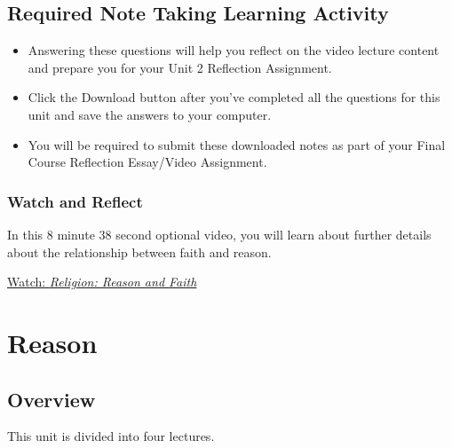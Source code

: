 \documentclass[
]{book}
\providecommand{\tightlist}{%
  \setlength{\itemsep}{0pt}\setlength{\parskip}{0pt}}
\begin{document}
\hypertarget{required-note-taking-learning-activity-1}{%
\section*{Required Note Taking Learning Activity}\label{required-note-taking-learning-activity-1}}

\begin{reflect}
\begin{itemize}
\tightlist
\item
  Answering these questions will help you reflect on the video lecture content and prepare you for your Unit 2 Reflection Assignment.
\item
  Click the Download button after you've completed all the questions for this unit and save the answers to your computer.
\item
  You will be required to submit these downloaded notes as part of your Final Course Reflection Essay/Video Assignment.
\end{itemize}
\end{reflect}

\hypertarget{watch-and-reflect-16}{%
\subsection*{Watch and Reflect}\label{watch-and-reflect-16}}

\begin{reflect}
In this 8 minute 38 second optional video, you will learn about further details about the relationship between faith and reason.

\href{https://www.youtube.com/watch?v=MTPHXNMi9tA}{Watch: \emph{Religion: Reason and Faith}}
\end{reflect}

\hypertarget{reason}{%
\chapter{Reason}\label{reason}}

\hypertarget{overview-2}{%
\section*{Overview}\label{overview-2}}

This unit is divided into four lectures.
\end{document}
